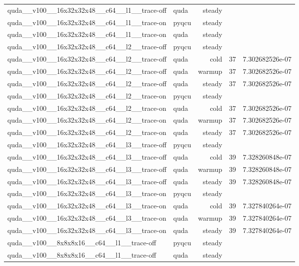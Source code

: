 \begin{table}[htbp]
\begin{tabular}{@{}llrrr@{}}
quda\_\_v100\_\_16x32x32x48\_\_c64\_\_l1\_\_trace-off & quda & steady &  &  \\
quda\_\_v100\_\_16x32x32x48\_\_c64\_\_l1\_\_trace-on & pyqcu & steady &  &  \\
quda\_\_v100\_\_16x32x32x48\_\_c64\_\_l1\_\_trace-on & quda & steady &  &  \\
quda\_\_v100\_\_16x32x32x48\_\_c64\_\_l2\_\_trace-off & pyqcu & steady &  &  \\
quda\_\_v100\_\_16x32x32x48\_\_c64\_\_l2\_\_trace-off & quda & cold & 37 & 7.302682526e-07 \\
quda\_\_v100\_\_16x32x32x48\_\_c64\_\_l2\_\_trace-off & quda & warmup & 37 & 7.302682526e-07 \\
quda\_\_v100\_\_16x32x32x48\_\_c64\_\_l2\_\_trace-off & quda & steady & 37 & 7.302682526e-07 \\
quda\_\_v100\_\_16x32x32x48\_\_c64\_\_l2\_\_trace-on & pyqcu & steady &  &  \\
quda\_\_v100\_\_16x32x32x48\_\_c64\_\_l2\_\_trace-on & quda & cold & 37 & 7.302682526e-07 \\
quda\_\_v100\_\_16x32x32x48\_\_c64\_\_l2\_\_trace-on & quda & warmup & 37 & 7.302682526e-07 \\
quda\_\_v100\_\_16x32x32x48\_\_c64\_\_l2\_\_trace-on & quda & steady & 37 & 7.302682526e-07 \\
quda\_\_v100\_\_16x32x32x48\_\_c64\_\_l3\_\_trace-off & pyqcu & steady &  &  \\
quda\_\_v100\_\_16x32x32x48\_\_c64\_\_l3\_\_trace-off & quda & cold & 39 & 7.328260848e-07 \\
quda\_\_v100\_\_16x32x32x48\_\_c64\_\_l3\_\_trace-off & quda & warmup & 39 & 7.328260848e-07 \\
quda\_\_v100\_\_16x32x32x48\_\_c64\_\_l3\_\_trace-off & quda & steady & 39 & 7.328260848e-07 \\
quda\_\_v100\_\_16x32x32x48\_\_c64\_\_l3\_\_trace-on & pyqcu & steady &  &  \\
quda\_\_v100\_\_16x32x32x48\_\_c64\_\_l3\_\_trace-on & quda & cold & 39 & 7.327840264e-07 \\
quda\_\_v100\_\_16x32x32x48\_\_c64\_\_l3\_\_trace-on & quda & warmup & 39 & 7.327840264e-07 \\
quda\_\_v100\_\_16x32x32x48\_\_c64\_\_l3\_\_trace-on & quda & steady & 39 & 7.327840264e-07 \\
quda\_\_v100\_\_8x8x8x16\_\_c64\_\_l1\_\_trace-off & pyqcu & steady &  &  \\
quda\_\_v100\_\_8x8x8x16\_\_c64\_\_l1\_\_trace-off & quda & steady &  &  \\

\end{tabular}
\end{table}

